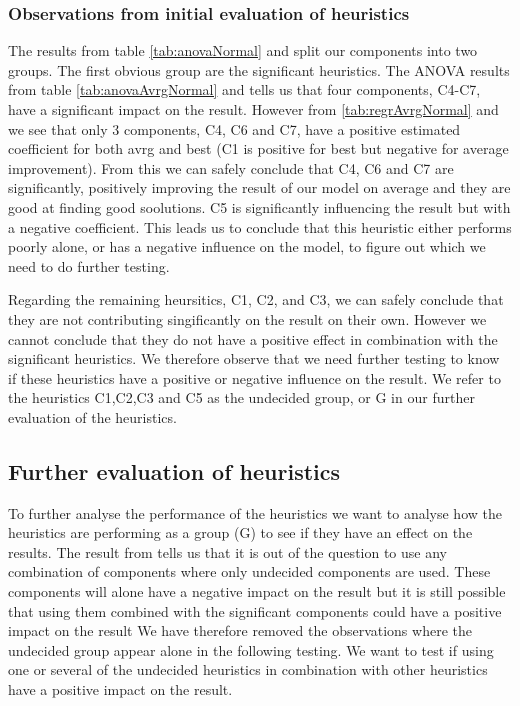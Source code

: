 \documentclass[../main.tex]{subfiles}
\begin{document}
\subsubsection{Observations from initial evaluation of heuristics}
The results from table \ref{tab:anovaNormal} and  split our components into two groups. 
The first obvious group are the significant heuristics.
The ANOVA results from table \ref{tab:anovaAvrgNormal} and  tells us that four components, C4-C7, have a significant impact on the result.
However from \ref{tab:regrAvrgNormal} and  we see that only 3 components, C4, C6 and C7, have a positive estimated coefficient for both avrg and best (C1 is positive for best but negative for average improvement).
From this we can safely conclude that C4, C6 and C7 are significantly, positively improving the result of our model on average and they are good at finding good soolutions. 
C5 is significantly influencing the result but with a negative coefficient. 
This leads us to conclude that this heuristic either performs poorly alone, or has a negative influence on the model, to figure out which we need to do further testing.
\par
Regarding the remaining heursitics, C1, C2, and C3, we can safely conclude that they are not contributing singificantly on the result on their own. 
However we cannot conclude that they do not have a positive effect in combination with the significant heuristics. 
We therefore observe that we need further testing to know if these heuristics have a positive or negative influence on the result.
We refer to the heuristics C1,C2,C3 and C5 as the undecided group, or G in our further evaluation of the heuristics.

\subsection{Further evaluation of heuristics}
\label{sec:evalH2}
To further analyse the performance of the heuristics we want to analyse how the heuristics are performing as a group (G) to see if they have an effect on the results.
The result from  tells us that it is out of the question to use any combination of components where only undecided components are used.
These components will alone have a negative impact on the result but it is still possible that using them combined with the significant components could have a positive impact on the result
We have therefore removed the observations where the undecided group appear alone in the following testing.
We want to test if using one or several of the undecided heuristics in combination with other heuristics have a positive impact on the result.
\end{document}
